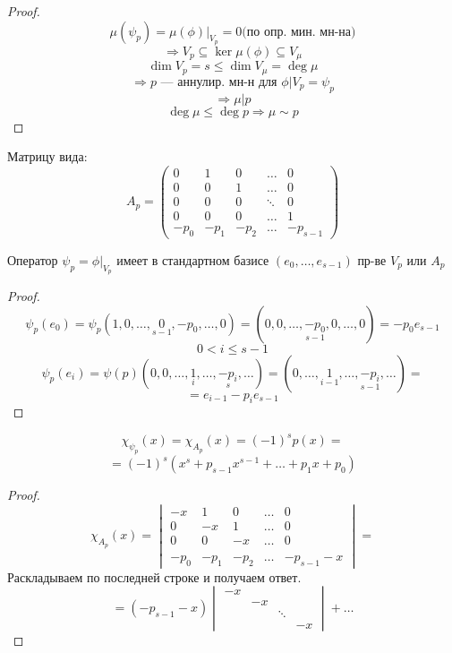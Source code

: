 \begin{proof}
    \[
    \mu(\psi_p) = \mu(\phi) |_{V_p} = 0 \text{(по опр. мин. мн-на)}
    \]
    \[
    \Rightarrow V_p \subseteq \ker \mu(\phi) \subseteq V_\mu
    \]
    \[
    \dim V_p = s \leq \dim V_{\mu} = \deg \mu
    \]
    \[
    \Rightarrow p \text{ --- аннулир. мн-н для $\phi | V_p = \psi_p$}
    \]
    \[
    \Rightarrow \mu | p
    \]
    \[
    \deg \mu \leq \deg p \Rightarrow \mu \sim p
    \]
\end{proof}
\begin{definition}
    Матрицу вида:
    \[
        A_p = \begin{pmatrix}0 & 1 & 0 & \ldots & 0 \\ 0 & 0 & 1 & \ldots & 0 \\ 0 & 0 & 0 & \ddots & 0 \\ 0 & 0 & 0 & \ldots & 1 \\ -p_0 & -p_1 & -p_2 & \ldots & -p_{s - 1}\end{pmatrix}
    \]
\end{definition}
\begin{statement}
\label{statement:07_4}
    Оператор $\psi_p = \phi|_{V_p}$ имеет в стандартном базисе $(e_0, \ldots, e_{s - 1})$ пр-ве $V_p$ или $A_p$
\end{statement}
\begin{proof}
    \[
    \psi_p(e_0) = \psi_p(1, 0, \ldots, \underset{s - 1}{0}, -p_0, \ldots, 0) = (0, 0, \ldots, \underset{s - 1}{-p_0}, 0, \ldots, 0) = -p_0 e_{s - 1}
    \]
    \[
    0 < i \leq s - 1
    \]
    \[
    \psi_p(e_i) = \psi(p)(0, 0, \ldots, \underset{i}{1}, \ldots, \underset{s}{-p_i}, \ldots) = (0, \ldots, \underset{i - 1}{1}, \ldots, \underset{s - 1}{-p_i}, \ldots) =
    \]
    \[
     = e_{i - 1} - p_i e_{s - 1}
    \]
\end{proof}
\begin{statement}
\label{statement:07_5}
    \[
    \chi_{\psi_p}(x) = \chi_{A_p}(x) = (-1)^{s} p(x) = 
    \]
    \[
     = (-1)^{s}(x^{s} + p_{s - 1}x^{s - 1} + \ldots + p_1 x + p_0)
    \]
\end{statement}
\begin{proof}
    \[
        \chi_{A_p}(x) = \begin{vmatrix}-x & 1 & 0 & \ldots & 0 \\ 0 & -x & 1 & \ldots & 0 \\ 0 & 0 & -x & \ldots & 0 \\ \\ -p_0 & -p_1 & -p_2 & \ldots & -p_{s - 1} - x \end{vmatrix} =
    \]
    Раскладываем по последней строке и получаем ответ.
    \[
        = (-p_{s - 1} - x) \begin{vmatrix} -x \\ & -x \\ & & \ddots \\  & & & -x\end{vmatrix} + \ldots
    \]
\end{proof}
